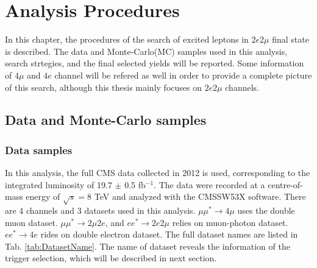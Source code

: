 \chapter{Analysis Procedures}
In this chapter, the procedures of the search of excited leptons in $2e2\mu$ final state is described. The data and Monte-Carlo(MC) samples used in this analysis, search strtegies, and the final selected yields will be reported. Some information of $4\mu$ and $4e$ channel will be refered as well in order to provide a complete picture of this search, although this thesis mainly focuses on $2e2\mu$ channels.     

\section{Data and Monte-Carlo samples}
\label{sec:Samples}
\subsection{Data samples}
In this analysis, the full CMS data collected in 2012 is used, corresponding to the integrated luminosity of 19.7 $\pm$ 0.5 fb$^{-1}$\cite{lumi001}. The data were recorded at a centre-of-mass energy of $\sqrt{s}=8$ TeV and analyzed with the CMSSW53X software. There are 4 channels and 3 datasets used in this analysis. $\mu \mu^{*} \rightarrow 4\mu$ uses the double muon dataset. $\mu \mu^{*} \rightarrow 2\mu2e$, and $e e^{*} \rightarrow 2e2\mu$ relies on muon-photon dataset. $e e^{*} \rightarrow 4e$ rides on double electron dataset. The full dataset names are listed in Tab. \ref{tab:DatasetName}. The name of dataset reveals the information of the trigger selection, which will be described in next section.  

